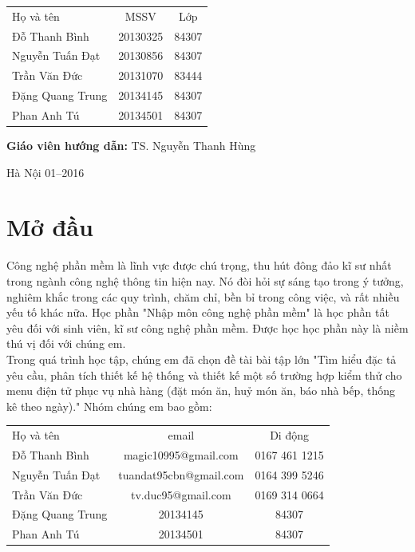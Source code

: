 \documentclass[a4paper,12pt]{report}
\begin{document}
\begin{longtable}{l c c}

Họ và tên & MSSV  & Lớp\\
Đỗ Thanh Bình & 20130325 & 84307 \\
Nguyễn Tuấn Đạt &  20130856 & 84307 \\
Trần Văn  Đức & 20131070 & 83444 \\
Đặng Quang Trung & 20134145  & 84307 \\
Phan Anh Tú & 20134501  & 84307 \\

\end{longtable}

\hspace{1cm}\fontsize{14}{16}\selectfont \textbf{Giáo viên hướng dẫn: }TS. Nguyễn Thanh Hùng\\[2cm]
\begin{center}
\fontsize{16}{19}\selectfont Hà Nội 01--2016

\end{center}
\newpage
\tableofcontents
\chapter*{Mở đầu}
Công nghệ phần mềm là lĩnh vực được chú trọng, thu hút đông đảo kĩ sư nhất trong ngành công nghệ thông tin hiện nay. Nó đòi hỏi sự sáng tạo trong ý tưởng, nghiêm khắc trong các quy trình, chăm chỉ, bền bỉ trong công việc, và rất nhiều yếu tố khác nữa. Học phần "Nhập môn công nghệ phần mềm" là học phần tất yêu đối với sinh viên, kĩ sư công nghệ phần mềm. Được học học phần này là niềm thú vị đối với chúng em.\\

Trong quá trình học tập, chúng em đã chọn đề tài bài tập lớn "Tìm	hiểu đặc	tả yêu	cầu,	phân	tích	thiết	kế hệ thống	và	thiết	kế một	số
trường	hợp	kiểm	thử cho menu	điện	tử phục	vụ nhà	hàng (đặt	món	ăn,	huỷ món	
ăn,	báo	nhà	bếp,	thống	kê	theo	ngày)." Nhóm chúng em bao gồm:\\
\begin{longtable}{l c c}

Họ và tên & email  & Di động\\
Đỗ Thanh Bình & magic10995@gmail.com & 0167 461 1215 \\
Nguyễn Tuấn Đạt &  tuandat95cbn@gmail.com & 0164 399 5246 \\
Trần Văn  Đức & tv.duc95@gmail.com & 0169 314 0664 \\
Đặng Quang Trung & 20134145  & 84307 \\
Phan Anh Tú & 20134501  & 84307 \\
\end{longtable}
\end{document}
